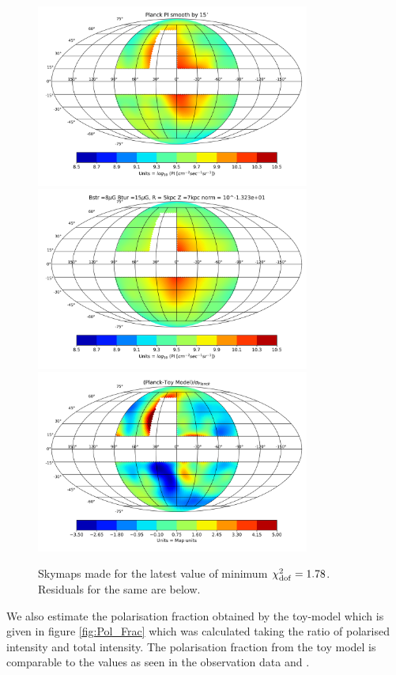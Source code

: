 \documentclass[12pt, a4 paper]{article}
\begin{document}
\begin{figure}[h!]
        \centering
        \includegraphics[width =9cm]{Images/Jan-08-2022_Planck_Sky_Map.png}%
        \includegraphics[width=9cm]{Images/Jan-08-2022_Skymap_Bstr_8_Btur_15_Rmag_5_Zmag_7_norm_-1.32e+01.png}
        \includegraphics[width = 9cm]{Images/Jan-08-2022_Residue_Bstr_5_Btur_14_Rmag_5_Zmag_7_norm_-1.29e+01.png}
    \caption{Skymaps made for the latest value of minimum $\chi^2_{\rm dof} = 1.78$. Residuals for the same are below.}
    \label{fig:Skymaps}
\end{figure}
We also estimate the polarisation fraction obtained by the toy-model which is given in figure \ref{fig:Pol_Frac} which was calculated taking the ratio of polarised intensity and total intensity. The polarisation fraction from the toy model is comparable to the values as seen in the observation data \cite{2013} and \cite{WMAP_Page}.
\end{document}
